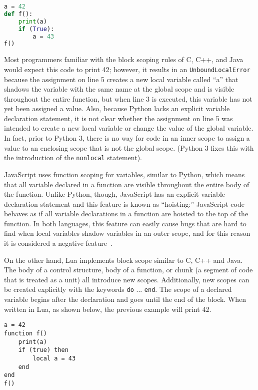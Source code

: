 \begin{lstlisting}[language=Python,caption=A demonstration of function scope in Python]
a = 42
def f():
	print(a)
	if (True):
		a = 43
f()
\end{lstlisting}

Most programmers familiar with the block scoping rules of C, C++, and Java would expect
this code to print 42; however, it results in an \texttt{UnboundLocalError} because
the assignment on line 5 creates a new local variable called ``a'' that shadows the
variable with the same name at the global scope and is visible throughout the
entire function, but when line 3 is executed, this variable has not yet been assigned
a value. Also, because Python lacks an explicit variable declaration statement,
it is not clear whether the assignment on line 5 was intended to create a new
local variable or change the value of the global variable. In fact, prior to Python 3,
there is no way for code in an inner scope to assign a value to an enclosing scope
that is not the global scope. (Python 3 fixes this with the introduction of the 
\texttt{nonlocal} statement).

JavaScript uses function scoping for variables, similar to Python, which means that all 
variable declared in a function are visible throughout the entire body of the function.
Unlike Python, though, JavaScript has an explicit variable declaration statement and
this feature is known as ``hoisting:'' JavaScript code behaves as if all 
variable declarations in a function are hoisted to the top of the function. In both
languages, this feature can easily cause bugs that are hard to find when local variables
shadow variables in an outer scope, and for this reason it is considered a negative 
feature~\cite{goodparts}.

On the other hand, Lua implements block scope similar to C, C++ and Java.
The body of a control structure, body of a function, or chunk (a segment of
code that is treated as a unit) all introduce new scopes. Additionally,
new scopes can be created explicitly with the keywords \texttt{do} ... \texttt{end}.
The scope of a declared variable begins after the declaration and goes until the
end of the block. When written in Lua, as shown below, the previous example
will print 42. 

\begin{lstlisting}[language={[5.2]Lua},caption=A demonstration of block scope in Lua]
a = 42
function f()
	print(a)
    if (true) then
        local a = 43
    end
end
f()
\end{lstlisting}

